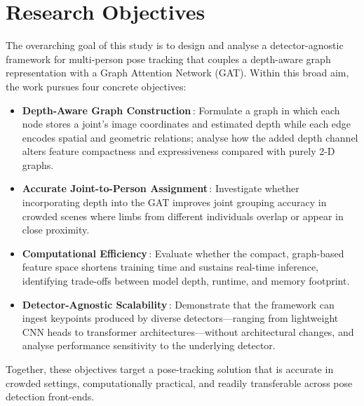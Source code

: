 \section{Research Objectives}

The overarching goal of this study is to design and analyse a detector-agnostic
framework for multi-person pose tracking that couples a depth-aware graph
representation with a Graph Attention Network (GAT).  
Within this broad aim, the work pursues four concrete objectives:

\begin{itemize}
    \item \textbf{Depth-Aware Graph Construction}\,:  
    Formulate a graph in which each node stores a joint’s image coordinates and
    estimated depth while each edge encodes spatial and geometric relations;
    analyse how the added depth channel alters feature compactness and
    expressiveness compared with purely 2-D graphs.

    \item \textbf{Accurate Joint-to-Person Assignment}\,:  
    Investigate whether incorporating depth into the GAT improves joint
    grouping accuracy in crowded scenes where limbs from different individuals
    overlap or appear in close proximity.

    \item \textbf{Computational Efficiency}\,:  
    Evaluate whether the compact, graph-based feature space shortens training
    time and sustains real-time inference, identifying trade-offs between model
    depth, runtime, and memory footprint.

    \item \textbf{Detector-Agnostic Scalability}\,:  
    Demonstrate that the framework can ingest keypoints produced by diverse
    detectors—ranging from lightweight CNN heads to transformer
    architectures—without architectural changes, and analyse performance
    sensitivity to the underlying detector.
\end{itemize}

Together, these objectives target a pose-tracking solution that is accurate in
crowded settings, computationally practical, and readily transferable across 
pose detection front-ends.